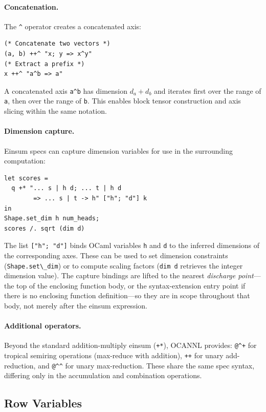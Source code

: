 \documentclass[acmsmall,nonacm,review]{acmart}
\newcommand{\code}[1]{\lstinline[basicstyle=\normalsize\ttfamily]{#1}}
\newcommand{\spec}[1]{\texttt{\small #1}}
\begin{document}
\paragraph{Concatenation.}
The \spec{\^{}} operator creates a concatenated axis:
\begin{lstlisting}
(* Concatenate two vectors *)
(a, b) ++^ "x; y => x^y"
(* Extract a prefix *)
x ++^ "a^b => a"
\end{lstlisting}
A concatenated axis \spec{a\^{}b} has dimension $d_a + d_b$ and iterates first
over the range of \spec{a}, then over the range of \spec{b}. This enables
block tensor construction and axis slicing within the same notation.

\paragraph{Dimension capture.}
Einsum specs can capture dimension variables for use in the surrounding
computation:
\begin{lstlisting}
let scores =
  q +* "... s | h d; ... t | h d
        => ... s | t -> h" ["h"; "d"] k
in
Shape.set_dim h num_heads;
scores /. sqrt (dim d)
\end{lstlisting}
The list \code{["h"; "d"]} binds OCaml variables \code{h} and \code{d} to
the inferred dimensions of the corresponding axes. These can be used to set
dimension constraints (\code{Shape.set\_dim}) or to compute scaling factors
(\code{dim d} retrieves the integer dimension value). The capture bindings
are lifted to the nearest \emph{discharge point}---the top of the enclosing
function body, or the syntax-extension entry point if there is no enclosing
function definition---so they are in scope throughout that body, not merely
after the einsum expression.

\paragraph{Additional operators.}
Beyond the standard addition-multiply einsum (\code{+*}), OCANNL provides:
\texttt{@\^{}+} for tropical semiring operations (max-reduce with addition),
\code{++} for unary add-reduction, and \texttt{@\^{}\^{}} for unary
max-reduction. These share the same spec syntax, differing only in the
accumulation and combination operations.

\subsection{Row Variables}
\label{sec:row-vars}
\end{document}

